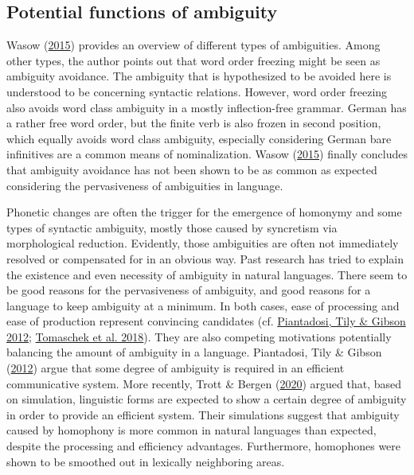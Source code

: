 \documentclass[
]{article}
\begin{document}
\hypertarget{avoid}{%
\subsection{Potential functions of ambiguity}\label{avoid}}

Wasow (\protect\hyperlink{ref-wasow15}{2015}) provides an overview of
different types of ambiguities. Among other types, the author points out
that word order freezing might be seen as ambiguity avoidance. The
ambiguity that is hypothesized to be avoided here is understood to be
concerning syntactic relations. However, word order freezing also avoids
word class ambiguity in a mostly inflection-free grammar. German has a
rather free word order, but the finite verb is also frozen in second
position, which equally avoids word class ambiguity, especially
considering German bare infinitives are a common means of
nominalization. Wasow (\protect\hyperlink{ref-wasow15}{2015}) finally
concludes that ambiguity avoidance has not been shown to be as common as
expected considering the pervasiveness of ambiguities in language.

Phonetic changes are often the trigger for the emergence of homonymy and
some types of syntactic ambiguity, mostly those caused by syncretism via
morphological reduction. Evidently, those ambiguities are often not
immediately resolved or compensated for in an obvious way. Past research
has tried to explain the existence and even necessity of ambiguity in
natural languages. There seem to be good reasons for the pervasiveness
of ambiguity, and good reasons for a language to keep ambiguity at a
minimum. In both cases, ease of processing and ease of production
represent convincing candidates (cf.
\protect\hyperlink{ref-piantadosi_et_al12}{Piantadosi, Tily \& Gibson
2012}; \protect\hyperlink{ref-tomaschek_et_al_18}{Tomaschek et al.
2018}). They are also competing motivations potentially balancing the
amount of ambiguity in a language. Piantadosi, Tily \& Gibson
(\protect\hyperlink{ref-piantadosi_et_al12}{2012}) argue that some
degree of ambiguity is required in an efficient communicative system.
More recently, Trott \& Bergen
(\protect\hyperlink{ref-trott+bergen20}{2020}) argued that, based on
simulation, linguistic forms are expected to show a certain degree of
ambiguity in order to provide an efficient system. Their simulations
suggest that ambiguity caused by homophony is more common in natural
languages than expected, despite the processing and efficiency
advantages. Furthermore, homophones were shown to be smoothed out in
lexically neighboring areas.
\end{document}
